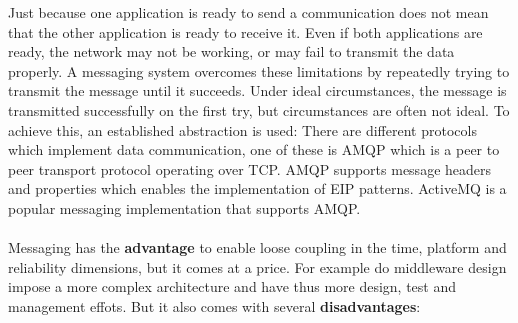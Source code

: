 \documentclass[../Main.tex]{subfiles}
\begin{document}
Just because one application is ready to send a communication does not mean that the 
other application is ready to receive it.
Even if both applications are ready, the network may not be working, or may fail to 
transmit the data properly.
A messaging system overcomes these limitations by repeatedly trying to transmit the 
message until it succeeds. Under ideal circumstances, the message is transmitted 
successfully on the first try, but circumstances are often not ideal.
To achieve this, an established abstraction is used: 
There are different protocols which implement data communication, one
of these is AMQP which is a peer to peer transport protocol operating over TCP. AMQP supports message headers and properties
which enables the implementation of EIP patterns. ActiveMQ is a popular messaging implementation that supports AMQP.
\\\\
Messaging has the \textbf{advantage} to enable loose coupling in the time, platform and reliability dimensions, but it comes at a price.
For example do middleware design impose a more complex architecture and have thus more design, test and management effots.
But it also comes with several \textbf{disadvantages}:
\end{document}
